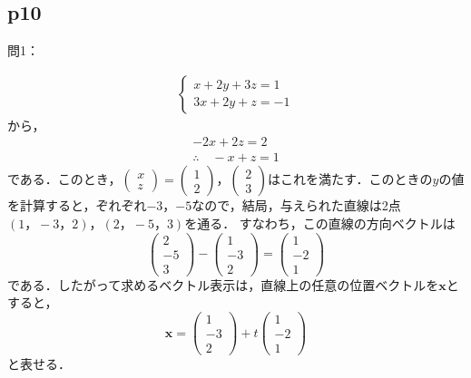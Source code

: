 \documentclass[dvipdfmx,uplatex,11pt]{jsarticle}
\begin{document}
\subsection{p10}
%
問1：
\begin{leftbar}
\begin{align*}
    \begin{cases}
        x+2y+3z=1 \\
        3x+2y+z=-1
    \end{cases}
\end{align*}
から，
\begin{gather*}
    -2x+2z=2 \\
    \therefore \quad -x+z=1
\end{gather*}
である．このとき，$
\left(
    \begin{array}{c}
        x \\
        z
    \end{array}
\right) =
\left(
    \begin{array}{c}
        1 \\
        2
    \end{array}
\right)，
\left(
    \begin{array}{c}
        2 \\
        3
    \end{array}
\right)
$はこれを満たす．このときの$y$の値を計算すると，ぞれぞれ$-3$，$-5$なので，結局，与えられた直線は2点$(1，-3，2)，(2，-5，3)$を通る．
すなわち，この直線の方向ベクトルは\[
    \left(
\begin{array}{c}
    2 \\
    -5 \\
    3
\end{array}
    \right)
    -
    \left(
        \begin{array}{c}
            1 \\
            -3 \\
            2
        \end{array}
            \right)
            =
            \left(
                \begin{array}{c}
                    1 \\
                    -2 \\
                    1
                \end{array}
                    \right)
                    \]
である．したがって求めるベクトル表示は，直線上の任意の位置ベクトルを$\bm{x}$とすると，
\[
    \bm{x}= \left(
        \begin{array}{c}
            1 \\
            -3 \\
            2
        \end{array}
            \right)
            +t
            \left(
            \begin{array}{c}
                1 \\
                -2 \\
                1
            \end{array}
            \right)
            \]
            と表せる．
\end{leftbar}
%
\newpage
%
%
%
\end{document}
